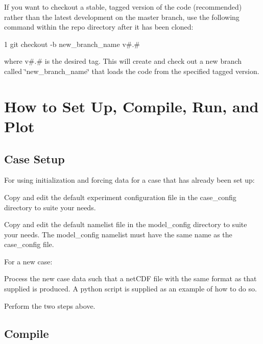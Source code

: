 If you want to checkout a stable, tagged version of the code (recommended) rather than the latest development on the master branch, use the following command within the repo directory after it has been cloned\+: 
\begin{DoxyCode}
1 git checkout -b new\_branch\_name v#.# 
\end{DoxyCode}
 where v\#.\# is the desired tag. This will create and check out a new branch called \char`\"{}new\+\_\+branch\+\_\+name\char`\"{} that loads the code from the specified tagged version.\hypertarget{index_how_to}{}\section{How to Set Up, Compile, Run, and Plot}\label{index_how_to}
\hypertarget{index_set_up}{}\subsection{Case Setup}\label{index_set_up}

\begin{DoxyItemize}
\item For using initialization and forcing data for a case that has already been set up\+:
\begin{DoxyEnumerate}
\item Copy and edit the default experiment configuration file in the case\+\_\+config directory to suite your needs.
\item Copy and edit the default namelist file in the model\+\_\+config directory to suite your needs. The model\+\_\+config namelist must have the same name as the case\+\_\+config file.
\end{DoxyEnumerate}
\item For a new case\+:
\begin{DoxyEnumerate}
\item Process the new case data such that a net\+C\+DF file with the same format as that supplied is produced. A python script is supplied as an example of how to do so.
\item Perform the two steps above. 
\end{DoxyEnumerate}
\end{DoxyItemize}\hypertarget{index_Compile}{}\subsection{Compile}\label{index_Compile}

